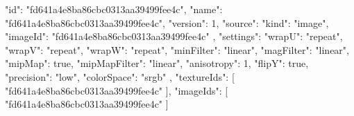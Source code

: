 {
  "id": "fd641a4e8ba86cbc0313aa39499fee4c",
  "name": "fd641a4e8ba86cbc0313aa39499fee4c",
  "version": 1,
  "source": {
    "kind": "image",
    "imageId": "fd641a4e8ba86cbc0313aa39499fee4c"
  },
  "settings": {
    "wrapU": "repeat",
    "wrapV": "repeat",
    "wrapW": "repeat",
    "minFilter": "linear",
    "magFilter": "linear",
    "mipMap": true,
    "mipMapFilter": "linear",
    "anisotropy": 1,
    "flipY": true,
    "precision": "low",
    "colorSpace": "srgb"
  },
  "textureIds": [
    "fd641a4e8ba86cbc0313aa39499fee4c"
  ],
  "imageIds": [
    "fd641a4e8ba86cbc0313aa39499fee4c"
  ]
}
